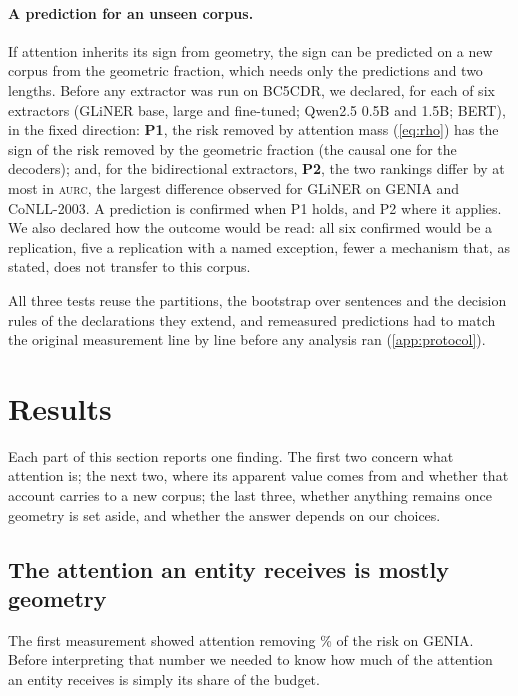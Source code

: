 \documentclass[11pt,a4paper]{article}
\newcommand{\gliner}{GLiNER}
\newcommand{\aurc}{\textsc{aurc}}
\begin{document}
\paragraph{A prediction for an unseen corpus.} If attention inherits its sign from geometry, the sign can be predicted on a new
corpus from the geometric fraction, which needs only the predictions and two lengths. Before any extractor was run on BC5CDR,
we declared, for each of six extractors (\gliner{} base, large and fine-tuned; Qwen2.5 0.5B and 1.5B; BERT), in the fixed
direction: \textbf{P1}, the risk removed by attention mass (\cref{eq:rho}) has the sign of the risk removed by the geometric
fraction (the causal one for the decoders); and, for the bidirectional extractors, \textbf{P2}, the two rankings differ by at
most \encMassGeoMaxGap{} in \aurc{}, the largest difference observed for \gliner{} on GENIA and CoNLL-2003. A prediction is
confirmed when P1 holds, and P2 where it applies. We also declared how the outcome would be read: all six confirmed would be a
replication, five a replication with a named exception, fewer a mechanism that, as stated, does not transfer to this corpus.

All three tests reuse the partitions, the bootstrap over sentences and the decision rules of the declarations they extend,
and remeasured predictions had to match the original measurement line by line before any analysis ran (\cref{app:protocol}).

\section{Results}
\label{sec:results}

Each part of this section reports one finding. The first two concern what attention is; the next two, where its
apparent value comes from and whether that account carries to a new corpus; the last three, whether anything remains
once geometry is set aside, and whether the answer depends on our choices.

\subsection{The attention an entity receives is mostly geometry}
\label{sec:res-geometry}

The first measurement showed attention removing \rrGeniaMassBase\% of the risk on GENIA. Before interpreting that number
we needed to know how much of the attention an entity receives is simply its share of the budget.
\end{document}
